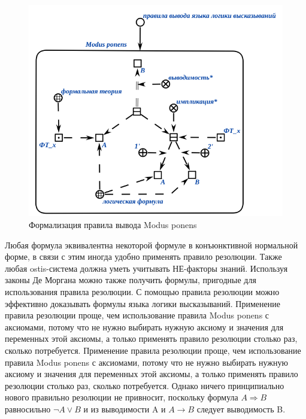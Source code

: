 \begin{figure}[H]
	\includegraphics[scale=0.8]{author/part3/figures/Modus_ponens.png}
	\caption{Формализация правила вывода Modus ponens}
	\label{fig:modus_ponens}
\end{figure}

Любая формула эквивалентна некоторой формуле в конъюнктивной нормальной форме, в связи с этим иногда удобно применять правило резолюции. Также любая ostis-система должна уметь учитывать НЕ-факторы знаний. Используя законы Де Моргана можно также получить формулы, пригодные для использования правила резолюции.
С помощью правила резолюции можно эффективно доказывать формулы языка логики высказываний.
Применение правила резолюции проще, чем использование правила Modus ponens с аксиомами, потому что не нужно выбирать нужную аксиому и значения для переменных этой аксиомы, а только применять правило резолюции столько раз, сколько потребуется.
Применение правила резолюции проще, чем использование правила Modus ponens с аксиомами, потому что не нужно выбирать нужную аксиому и значения для переменных этой аксиомы, а только применять правило резолюции столько раз, сколько потребуется.
Однако ничего принципиально нового правильно резолюции не привносит, поскольку формула $A \Rightarrow B$  равносильно $\neg A \lor B$ и из выводимости A и $A \rightarrow B$ следует выводимость B.

